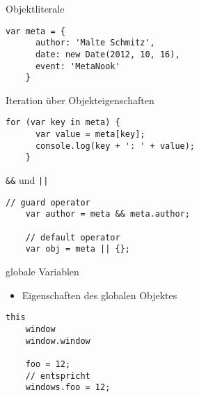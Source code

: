 \begin{frame}[fragile]{Objektliterale}
  \begin{lstlisting}[gobble=4]
    var meta = {
      author: 'Malte Schmitz',
      date: new Date(2012, 10, 16),
      event: 'MetaNook'
    }
  \end{lstlisting}
\end{frame}

\begin{frame}[fragile]{Iteration über Objekteigenschaften}
  \begin{lstlisting}[gobble=4]
    for (var key in meta) {
      var value = meta[key];
      console.log(key + ': ' + value);
    }
  \end{lstlisting}
\end{frame}

\begin{frame}[fragile]{\texttt{\&\&} und \texttt{||}}
  \begin{lstlisting}[gobble=4]
    // guard operator
    var author = meta && meta.author;
    
    // default operator
    var obj = meta || {};
  \end{lstlisting}
\end{frame}


\begin{frame}[fragile]{globale Variablen}
  \begin{itemize}
    \item Eigenschaften des globalen Objektes
  \end{itemize}
  
  \begin{lstlisting}[gobble=4]
    this
    window
    window.window
  
    foo = 12;
    // entspricht
    windows.foo = 12;
  \end{lstlisting}
\end{frame}


